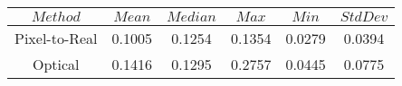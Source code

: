 \begin{table}[h]
\centering
\begin{tabular}{|c|c|c|c|c|c|}
\hline
$Method$ & $Mean$ & $Median$ & $Max$ & $Min$ & $StdDev$ \\
\hline
Pixel-to-Real & 0.1005 & 0.1254 & 0.1354 & 0.0279 & 0.0394 \\
\hline
Optical & 0.1416 & 0.1295 & 0.2757 & 0.0445 & 0.0775 \\
\hline
\end{tabular}
\end{table}
